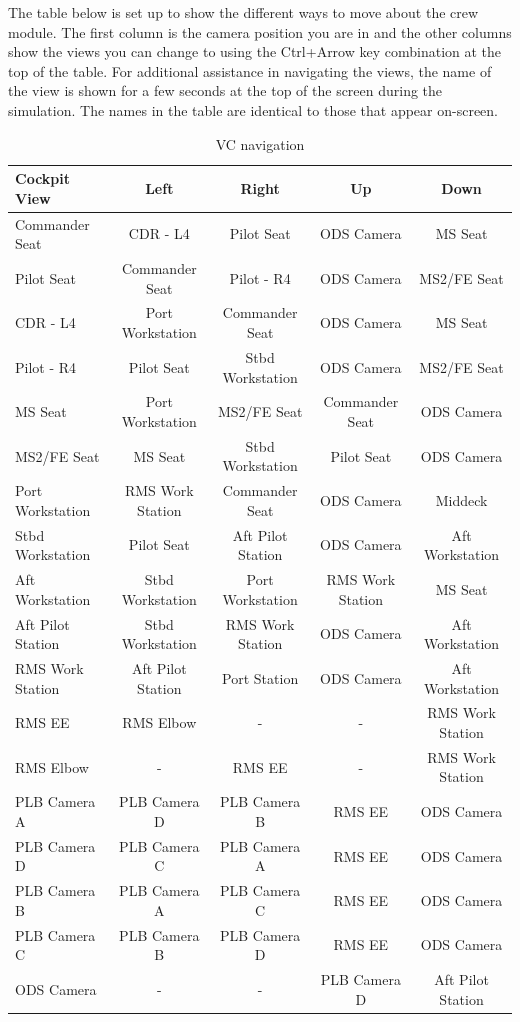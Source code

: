 \documentclass[13pt]{article}
\begin{document}
\begin{multicols*}{2}
The table below is set up to show the different ways to move about the crew module. The first column is the camera position you are in and the other columns show the views you can change to using the Ctrl+Arrow key combination at the top of the table. For additional assistance in navigating the views, the name of the view is shown for a few seconds at the top of the screen during the simulation. The names in the table are identical to those that appear on-screen.\\
\end{multicols*}
\begin{table}[H]
  \centering
  \begin{tabular}{l|c c c c }
	Cockpit View & Left & Right & Up & Down \\
	\hline
	Commander Seat & CDR - L4 & Pilot Seat & ODS Camera & MS Seat \\
	Pilot Seat & Commander Seat & Pilot - R4 & ODS Camera & MS2/FE Seat \\
	CDR - L4 & Port Workstation & Commander Seat & ODS Camera & MS Seat \\
	Pilot - R4 & Pilot Seat & Stbd Workstation & ODS Camera & MS2/FE Seat \\
	MS Seat & Port Workstation & MS2/FE Seat & Commander Seat & ODS Camera\\
	MS2/FE Seat & MS Seat & Stbd Workstation & Pilot Seat & ODS Camera\\
	Port Workstation & RMS Work Station & Commander Seat & ODS Camera & Middeck\\
	Stbd Workstation & Pilot Seat & Aft Pilot Station & ODS Camera & Aft Workstation\\
	Aft Workstation & Stbd Workstation & Port Workstation & RMS Work Station & MS Seat\\
	Aft Pilot Station & Stbd Workstation & RMS Work Station & ODS Camera & Aft Workstation\\
	RMS Work Station & Aft Pilot Station & Port Station & ODS Camera & Aft Workstation\\
	RMS EE & RMS Elbow & - & - & RMS Work Station\\
	RMS Elbow & - & RMS EE & - & RMS Work Station\\
	PLB Camera A & PLB Camera D & PLB Camera B & RMS EE & ODS Camera\\
	PLB Camera D & PLB Camera C & PLB Camera A & RMS EE & ODS Camera\\
	PLB Camera B & PLB Camera A & PLB Camera C & RMS EE & ODS Camera\\
	PLB Camera C & PLB Camera B & PLB Camera D & RMS EE & ODS Camera\\
	ODS Camera & - & - & PLB Camera D & Aft Pilot Station\\
  \end{tabular}
  \caption{VC navigation}
  \label{tab:VC_navigation}
\end{table}
\newpage
\end{document}
